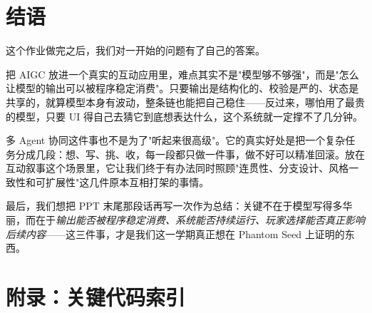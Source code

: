 \documentclass[12pt,a4paper]{article}
\begin{document}
\section{结语}
\label{sec:conclusion}

这个作业做完之后，我们对一开始的问题有了自己的答案。

把 AIGC 放进一个真实的互动应用里，难点其实不是"模型够不够强"，而是"怎么让模型的输出可以被程序稳定消费"。只要输出是结构化的、校验是严的、状态是共享的，就算模型本身有波动，整条链也能把自己稳住——反过来，哪怕用了最贵的模型，只要 UI 得自己去猜它到底想表达什么，这个系统就一定撑不了几分钟。

多 Agent 协同这件事也不是为了"听起来很高级"。它的真实好处是把一个复杂任务分成几段：想、写、挑、收，每一段都只做一件事，做不好可以精准回滚。放在互动叙事这个场景里，它让我们终于有办法同时照顾"连贯性、分支设计、风格一致性和可扩展性"这几件原本互相打架的事情。

最后，我们想把 PPT 末尾那段话再写一次作为总结：关键不在于模型写得多华丽，而在于\emph{输出能否被程序稳定消费、系统能否持续运行、玩家选择能否真正影响后续内容}——这三件事，才是我们这一学期真正想在 Phantom Seed 上证明的东西。

\section*{附录：关键代码索引}
\end{document}
